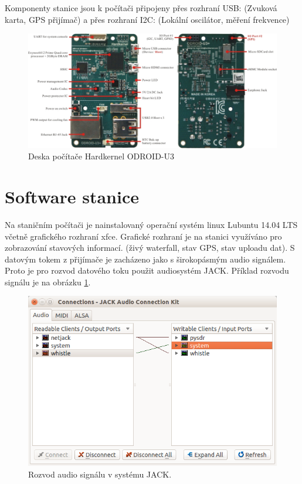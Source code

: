 \documentclass[12pt,a4paper,oneside]{article}
\begin{document}
Komponenty stanice jsou k počítači připojeny přes rozhraní USB: (Zvuková karta, GPS přijímač) a přes rozhraní I2C: (Lokální oscilátor, měření frekvence)

\begin{figure}[htbp]
\begin{center}
\includegraphics [width=140mm] {./img/u3rev05boarddetail.jpg} 
\end{center}
\caption{Deska počítače Hardkernel ODROID-U3}
\end{figure}

\section{Software stanice}

Na staničním počítači je nainstalovaný operační systém linux Lubuntu 14.04 LTS včetně grafického rozhraní xfce.  Grafické rozhraní je na stanici využíváno pro zobrazování stavových informací. (živý waterfall, stav GPS, stav uploadu dat). S datovým tokem z přijímače je zacházeno jako s širokopásmým audio signálem. Proto je pro rozvod  datového toku použit audiosystém JACK. Příklad rozvodu signálu je na obrázku \ref{qjackctl}.

\begin{figure}[htbp]
\centering
\includegraphics [width=120mm] {./img/JACK_audio.png} 
\caption{Rozvod audio signálu v systému JACK.}
\label{qjackctl}
\end{figure}
\end{document}
